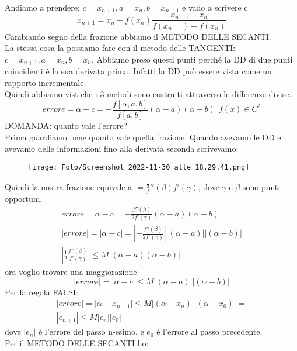 \documentclass[a4paper, portrait]{book}
\numberwithin{equation}{chapter} %
\begin{document}
Andiamo a prendere: $c = x_{n+1}, a = x_n, b = x_{n-1}$ e vado a scrivere c
\begin{equation}
    x_{n+1} = x_n - f(x_n) \frac{x_{n-1}-x_n}{f(x_{n-1})-f(x_n)}
\end{equation}
Cambiando segno della frazione abbiamo il METODO DELLE SECANTI.\\
La stessa cosa la possiamo fare con il metodo delle TANGENTI: $c = x_{n+1}, a = x_n, b = x_{n}$. Abbiamo preso questi punti perché la DD di due punti coincidenti è la sua derivata prima. Infatti la DD può essere vista come un rapporto incrementale.\\
Quindi abbiamo vist che i 3 metodi sono costruiti attraverso le differenze divise.
\begin{equation}
    errore = \alpha - c = - \frac{f[\alpha, a,b]}{f[a,b]}(\alpha - a)(\alpha - b) \ \ f(x) \in C^2
\end{equation}
DOMANDA: quanto vale l'errore?\\
Prima guardiamo bene quanto vale quella frazione. Quando avevamo le DD e avevamo delle informazioni fino alla derivata seconda scrivevamo:
\begin{figure}[h!]
    \centering
    \texttt{[image: Foto/Screenshot 2022-11-30 alle 18.29.41.png]}
\end{figure}
Quindi la nostra frazione equivale a $ = \frac{\frac{1}{2}}f''(\beta){f'(\gamma)}$, dove $\gamma$ e $\beta$ sono punti opportuni.
\begin{gather}
    errore = \alpha - c = -\frac{f''(\beta)}{2f'(\gamma)}(\alpha - a)(\alpha -b)\\
    |errore| = |\alpha - c| = \left|-\frac{f''(\beta)}{2f'(\gamma)}\right||(\alpha - a)||(\alpha -b)|\\
    \left|\frac{1}{2}\frac{f''(\beta)}{f'(\gamma)}\right| \leq M |(\alpha - a)(\alpha - b)|
\end{gather}
ora voglio trovare una maggiorazione
\begin{equation}
    |errore| = |\alpha - c| \leq M |(\alpha - a)||(\alpha - b)|
\end{equation}
Per la regola FALSI:
\begin{gather}
    |errore| = |\alpha - x_{n-1}| \leq M |(\alpha - x_n)||(\alpha - x_0)| = \\
    |e_{n+1}| \leq M |e_n||e_0|
\end{gather}
dove $|e_n|$ è l'errore del passo n-esimo, e $e_0$ è l'errore al passo precedente.\\
Per il METODO DELLE SECANTI ho:
\end{document}
